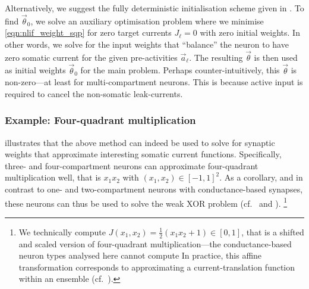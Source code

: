 Alternatively, we suggest the fully deterministic initialisation scheme given in .
To find $\vec \theta_0$, we solve an auxiliary optimisation problem where we minimise \cref{eqn:nlif_weight_sqp} for zero target currents $J_\ell = 0$ with zero initial weights.
In other words, we solve for the input weights that \enquote{balance} the neuron to have zero somatic current for the given pre-activities $\vec a_\ell$.
The resulting $\vec \theta$ is then used as initial weights $\vec \theta_0$ for the main problem.
Perhaps counter-intuitively, this $\vec \theta$ is non-zero---at least for multi-compartment neurons.	
This is because active input is required to cancel the non-somatic leak-currents.


\subsubsection{Example: Four-quadrant multiplication}

 illustrates that the above method can indeed be used to solve for synaptic weights that approximate interesting somatic current functions.
Specifically, three- and four-compartment neurons can approximate four-quadrant multiplication well, that is $x_1 x_2$ with $(x_1, x_2) \in [-1, 1]^2$.
As a corollary, and in contrast to one- and two-compartment neurons with conductance-based synapses, these neurons can thus be used to solve the weak XOR problem (cf.~ and ).%
\footnote{We technically compute $J(x_1, x_2) = \frac{1}2 (x_1 x_2 + 1) \in [0, 1]$, that is a shifted and scaled version of four-quadrant multiplication---the conductance-based neuron types analysed here cannot compute 
In practice, this affine transformation corresponds to approximating a current-translation function within an \NEF ensemble (cf.~).
}

